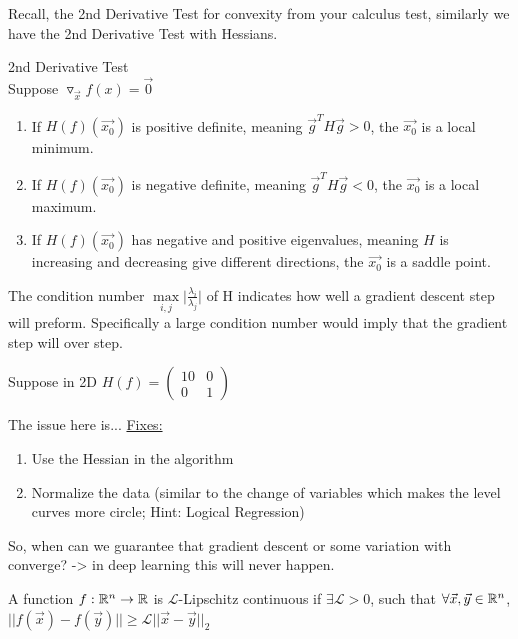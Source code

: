 Recall, the 2nd Derivative Test for convexity from your calculus test, similarly we have the 2nd Derivative Test with Hessians.
\begin{theorem}
2nd Derivative Test\\
Suppose $\triangledown_{\vec{x}} f(x)=\vec{0}$\\
\begin{enumerate}
    \item If $H(f)(\vec{x_0})$ is positive definite, meaning $\vec{g}^TH\vec{g}>0$, the $\vec{x_0}$ is a local minimum.
    \item If $H(f)(\vec{x_0})$ is negative definite, meaning $\vec{g}^TH\vec{g}<0$, the $\vec{x_0}$ is a local maximum.
    \item If $H(f)(\vec{x_0})$ has negative and positive eigenvalues, meaning $H$ is increasing and decreasing give different directions, the $\vec{x_0}$ is a saddle point.
\end{enumerate}
\end{theorem}
\begin{remark}
The condition number $\max\limits_{i,j} \lvert\frac{\lambda_i}{\lambda_j} \rvert$
of H indicates how well a gradient descent step will preform. Specifically a large condition number would imply that the gradient step will over step. 
\end{remark} 

\begin{example}
Suppose in 2D $H(f)=
\begin{pmatrix} 
10 & 0\\
0 & 1
\end{pmatrix}
$
\end{example}
The issue here is...
\underline{Fixes:}
\begin{enumerate}
    \item Use the Hessian in the algorithm
    \item Normalize the data (similar to the change of variables which makes the level curves more circle; Hint: Logical Regression)
\end{enumerate}
So, when can we guarantee that gradient descent or some variation with converge? -> in deep learning this will never happen.

\begin{definition}
A function $f: \R^n\rightarrow\R$ is $\mathcal{L}$-Lipschitz continuous if $\exists \mathcal{L}>0$, such that $\forall \vec{x}, \vec{y}\in \R^n$,$||f(\vec{x})-f(\vec{y})||\geq \mathcal{L}||\vec{x}-\vec{y}||_2$
\end{definition}

